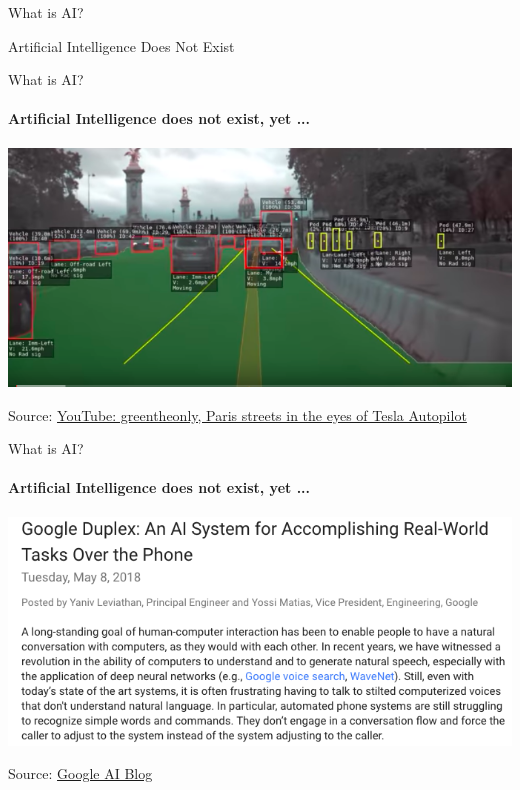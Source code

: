 \begin{frame}[c]{What is AI?}
  \begin{center}
  \huge Artificial Intelligence Does Not Exist
  \end{center}
  \end{frame}

\begin{frame}{What is AI?}
\framesubtitle{Artificial Intelligence does not exist, yet ...}
\includegraphics[width=\textwidth]{graphics/tesla_paris}

Source: \href{https://www.youtube.com/watch?v=_1MHGUC_BzQs}{YouTube: greentheonly, Paris streets in the eyes of Tesla Autopilot}
\end{frame}

\begin{frame}{What is AI?}
\framesubtitle{Artificial Intelligence does not exist, yet ...}
\includegraphics[width=\textwidth]{graphics/google_duplex}

Source: \href{https://ai.googleblog.com/2018/05/duplex-ai-system-for-natural-conversation.html}{Google AI Blog}
\end{frame}

